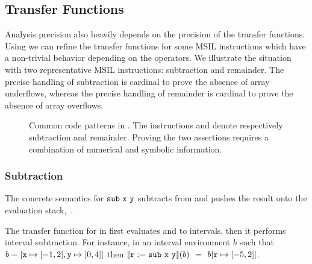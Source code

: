 \documentclass{elsart}
\begin{document}
\subsection{Transfer Functions}
Analysis precision also heavily depends on the precision of the transfer functions.
Using \Pentagons{} we can refine the transfer functions for some MSIL instructions  which have a non-trivial behavior depending on the operators.
We illustrate the situation with two representative MSIL instructions: subtraction and remainder.
The precise handling of subtraction is cardinal to prove the absence of array underflows, whereas the precise handling of remainder is cardinal to prove the absence of array overflows.

\begin{figure}[t]
\centering
{}
\qquad
{}
\caption{Common code patterns in . The instructions  and   denote respectively subtraction and remainder.
Proving the two assertions requires a combination of numerical and symbolic information.}


\end{figure}

\subsubsection{Subtraction}
The concrete semantics for $\mathtt{sub}\ \code{x}\ \code{y}$ subtracts   from  and pushes the result onto the evaluation stack,~\cite{ECMA-CLI}.

The transfer function for  in  \Intervals{} first evaluates  and  to intervals, then it performs interval subtraction.
For instance, in an interval environment $b$ such that  $b = [\mathtt{x} \mapsto [-1, 2], \mathtt{y} \mapsto [0, 4]]$ then $\llbracket \mathtt{r := sub\ x\  y} \rrbracket{(b)}$  $=$ $b[\mathtt{r} \mapsto [-5, 2]]$.
\end{document}
